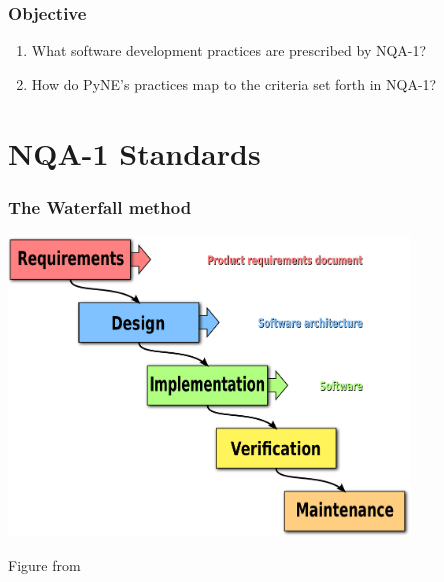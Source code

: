\documentclass[12pt]{beamer}
\begin{document}
\begin{frame}[fragile]
\frametitle{Objective}

\begin{enumerate}
\item{What software development practices are prescribed by NQA-1?}
\item{How do PyNE's practices map to the criteria set forth in NQA-1?}
\end{enumerate}

\end{frame}

\section{NQA-1 Standards}

\begin{frame}[fragile]
\frametitle{The Waterfall method \cite{waterfall}}
\centerline{\includegraphics[width=0.8\textwidth]{figures/waterfall.pdf}}
Figure from \cite{waterfall_wiki}
\end{frame}
\end{document}
